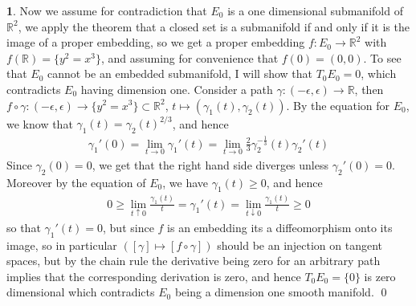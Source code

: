 \documentclass[10.5pt]{article}
\theoremstyle{definition}
\newtheorem{pb}{}
\newcommand{\set}[1]{\{#1\}}
\begin{document}
\begin{pb}
        Now we assume for contradiction that \(E_0\) is a one dimensional submanifold of \(\mathbb{R}^2\), we apply the theorem that a closed set is a submanifold if and only if it is the image of a proper embedding, so we get a proper embedding \(f: E_0 \to \mathbb{R}^2\) with   \(f(\mathbb{R}) = \set{y^2 = x^3}\), and assuming for convenience that \(f(0) = (0,0)\). To see that \(E_0\) cannot be an embedded submanifold, I will show that \(T_0E_0 = 0\), which contradicts \(E_0\) having dimension one. Consider a path \(\gamma:(-\epsilon,\epsilon) \to \mathbb{R}\), then \(f\circ\gamma:(-\epsilon,\epsilon) \to \set{y^2 = x^3} \subset \mathbb{R}^2\), \(t \mapsto (\gamma_1(t),\gamma_2(t))\). By the equation for \(E_0\), we know that \(\gamma_1(t) = \gamma_2(t)^{2/3}\), and hence
        \begin{align*}
            \gamma_1'(0) = \lim_{t\to 0} \gamma_1'(t) = \lim_{t\to 0}\frac23 \gamma_2^{-\frac13}(t)\gamma_2'(t)
        \end{align*}
        Since \(\gamma_2(0) = 0\), we get that the right hand side diverges unless \(\gamma_2'(0) = 0\). Moreover by the equation of \(E_0\), we have \(\gamma_1(t) \geq 0\), and hence
        \begin{align*}
            0 \geq \lim_{t\uparrow 0}\frac{\gamma_1(t)}{t} = \gamma_1'(t) = \lim_{t\downarrow 0}\frac{\gamma_1(t)}{t} \geq 0
        \end{align*}
        so that \(\gamma_1'(t) = 0\), but since \(f\) is an embedding its a diffeomorphism onto its image, so in particular \(([\gamma] \mapsto [f\circ \gamma])\) should be an injection on tangent spaces, but by the chain rule the derivative being zero for an arbitrary path implies that the corresponding derivation is zero, and hence \(T_0E_0 = \set{0}\) is zero dimensional which contradicts \(E_0\) being a dimension one smooth manifold. \qed
    \end{pb}
\end{document}
